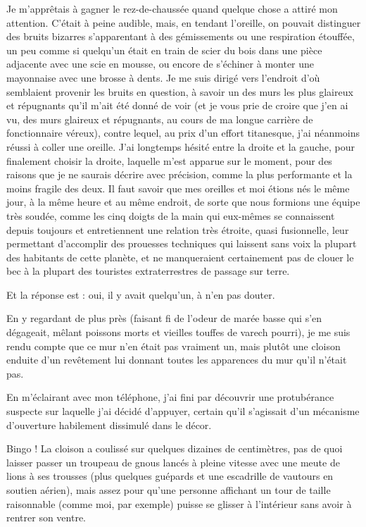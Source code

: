 Je m’apprêtais à gagner le rez-de-chaussée quand quelque chose a attiré mon attention. C’était à peine audible, mais, en tendant l’oreille, on pouvait distinguer des bruits bizarres s’apparentant à des gémissements ou une respiration étouffée, un peu comme si quelqu’un était en train de scier du bois dans une pièce adjacente avec une scie en mousse, ou encore de s’échiner à monter une mayonnaise avec une brosse à dents. Je me suis dirigé vers l’endroit d’où semblaient provenir les bruits en question, à savoir un des murs les plus glaireux et répugnants qu’il m’ait été donné de voir (et je vous prie de croire que j’en ai vu, des murs glaireux et répugnants, au cours de ma longue carrière de fonctionnaire véreux), contre lequel, au prix d’un effort titanesque, j’ai néanmoins réussi à coller une oreille. J’ai longtemps hésité entre la droite et la gauche, pour finalement choisir la droite, laquelle m’est apparue sur le moment, pour des raisons que je ne saurais décrire avec précision, comme la plus performante et la moins fragile des deux. Il faut savoir que mes oreilles et moi étions nés le même jour, à la même heure et au même endroit, de sorte que nous formions une équipe très soudée, comme les cinq doigts de la main qui eux-mêmes se connaissent depuis toujours et entretiennent une relation très étroite, quasi fusionnelle, leur permettant d’accomplir des prouesses techniques qui laissent sans voix la plupart des habitants de cette planète, et ne manqueraient certainement pas de clouer le bec à la plupart des touristes extraterrestres de passage sur terre.

Et la réponse est : oui, il y avait quelqu’un, à n’en pas douter.

En y regardant de plus près (faisant fi de l’odeur de marée basse qui s’en dégageait, mêlant poissons morts et vieilles touffes de varech pourri), je me suis rendu compte que ce mur n’en était pas vraiment un, mais plutôt une cloison enduite d’un revêtement lui donnant toutes les apparences du mur qu’il n’était pas.

En m’éclairant avec mon téléphone, j’ai fini par découvrir une protubérance suspecte sur laquelle j’ai décidé d’appuyer, certain qu’il s’agissait d’un mécanisme d’ouverture habilement dissimulé dans le décor.

Bingo ! La cloison a coulissé sur quelques dizaines de centimètres, pas de quoi laisser passer un troupeau de gnous lancés à pleine vitesse avec une meute de lions à ses trousses (plus quelques guépards et une escadrille de vautours en soutien aérien), mais assez pour qu’une personne affichant un tour de taille raisonnable (comme moi, par exemple) puisse se glisser à l’intérieur sans avoir à rentrer son ventre.

